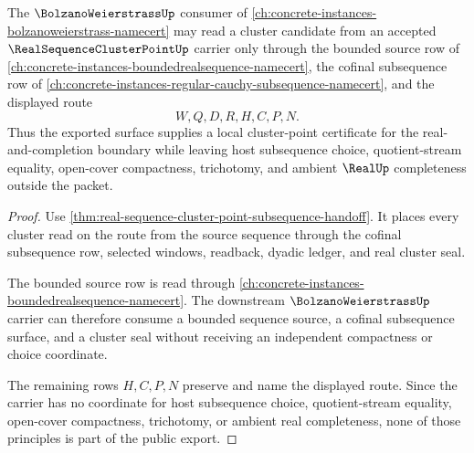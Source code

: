 \begin{theorem}\label{thm:real-sequence-cluster-point-public-export}
The $\BolzanoWeierstrassUp$ consumer of \autoref{ch:concrete-instances-bolzanoweierstrass-namecert} may read a cluster candidate from an accepted $\RealSequenceClusterPointUp$ carrier only through the bounded source row of \autoref{ch:concrete-instances-boundedrealsequence-namecert}, the cofinal subsequence row of \autoref{ch:concrete-instances-regular-cauchy-subsequence-namecert}, and the displayed route
$$
W,Q,D,R,H,C,P,N.
$$
Thus the exported surface supplies a local cluster-point certificate for the real-and-completion boundary while leaving host subsequence choice, quotient-stream equality, open-cover compactness, trichotomy, and ambient $\RealUp$ completeness outside the packet.
\end{theorem}
\begin{proof}
Use \autoref{thm:real-sequence-cluster-point-subsequence-handoff}. It places every cluster read on the route from the source sequence through the cofinal subsequence row, selected windows, readback, dyadic ledger, and real cluster seal.

The bounded source row is read through \autoref{ch:concrete-instances-boundedrealsequence-namecert}. The downstream $\BolzanoWeierstrassUp$ carrier can therefore consume a bounded sequence source, a cofinal subsequence surface, and a cluster seal without receiving an independent compactness or choice coordinate.

The remaining rows $H,C,P,N$ preserve and name the displayed route. Since the carrier has no coordinate for host subsequence choice, quotient-stream equality, open-cover compactness, trichotomy, or ambient real completeness, none of those principles is part of the public export.
\end{proof}

